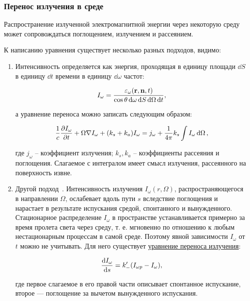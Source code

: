 \documentclass[10pt, a4paper]{article}
\begin{document}
\subsubsection{Перенос излучения в среде}

Распространение излученной электромагнитной энергии через некоторую среду может сопровождаться поглощением, излучением и рассеянием.

К написанию уравнения существует несколько разных подходов, видимо:

\begin{enumerate}
	
	\item Интенсивность определяется как энергия, проходящая в единицу площади $\dd{S}$ в единицу $\dd{t}$ времени в единицу $\dd{\omega}$ частот:
	
	\begin{equation*}
		I_{\omega} = \frac{\varepsilon_\omega(\vb{r},\vb{n},t)}{\cos\theta \dd{\omega}\dd{S}\dd{\Omega}\dd{t}},
	\end{equation*}
	
	а уравнение переноса можно записать следующим образом:
	
	\begin{equation*}
		\frac{1}{c} \pdv{I_\omega}{t} + \Omega\nabla I_\omega + (k_s + k_a) I_\omega = j_\omega + \frac{1}{4\pi} k_s \int I_\omega \dd{\Omega},
	\end{equation*}
	
	где $j_\omega$ -- коэффициент излучения; $k_s, k_a$ -- коэффициенты рассеяния и поглощения. Слагаемое с интегралом имеет смысл излучения, рассеянного на поверхность извне.
	
	\item Другой подход~\cite{raizer}. Интенсивность излучения $I_\omega(r, \Omega)$, распространяющегося в направлении $\Omega$, ослабевает вдоль пути $s$ вследствие поглощения и нарастает в результате испускания средой, спонтанного и вынужденного. Стационарное распределение $I_\omega$ в пространстве устанавливается примерно за время пролета света через среду, т. е. мгновенно по отношению к любым нестационарным процессам в самой среде. Поэтому явной зависимости $I_\omega$ от $t$ можно не учитывать. Для него существует \uline{уравнение переноса излучения}:
	
	\begin{equation*}
		\dv{I_\omega}{s} = k_{-}'(I_{\omega p}-I_\omega),
	\end{equation*}
	
	где первое слагаемое в его правой части описывает спонтанное испускание, второе — поглощение за вычетом вынужденного испускания.
	

\end{enumerate}
\end{document}
